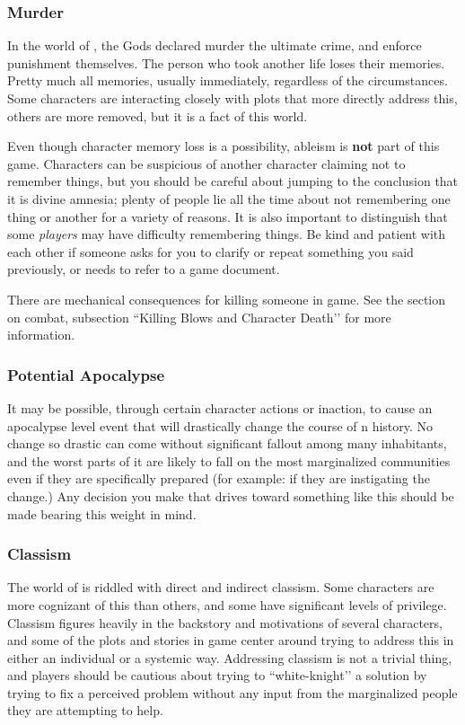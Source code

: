 \documentclass[sheet]{GL2020}
\begin{document}
\subsubsection{Murder}
In the world of \pEarth{}, the Gods declared murder the ultimate crime, and enforce punishment themselves. The person who took another life loses their memories. Pretty much all memories, usually immediately, regardless of the circumstances. Some characters are interacting closely with plots that more directly address this, others are more removed, but it is a fact of this world. 

Even though character memory loss is a possibility, ableism is \textbf{not} part of this game. Characters can be suspicious of another character claiming not to remember things, but you should be careful about jumping to the conclusion that it is divine amnesia; plenty of people lie all the time about not remembering one thing or another for a variety of reasons. It is also important to distinguish that some \emph{players} may have difficulty remembering things. Be kind and patient with each other if someone asks for you to clarify or repeat something you said previously, or needs to refer to a game document.

There are mechanical consequences for killing someone in game. See the section on combat, subsection ``Killing Blows and Character Death’’ for more information.

\subsubsection{Potential Apocalypse}
It may be possible, through certain character actions or inaction, to cause an apocalypse level event that will drastically change the course of \pEarth{}n history. No change so drastic can come without significant fallout among many inhabitants, and the worst parts of it are likely to fall on the most marginalized communities even if they are specifically prepared (for example: if they are instigating the change.) Any decision you make that drives toward something like this should be made bearing this weight in mind.

\subsubsection{Classism}
The world of \pEarth{} is riddled with direct and indirect classism. Some characters are more cognizant of this than others, and some have significant levels of privilege. Classism figures heavily in the backstory and motivations of several characters, and some of the plots and stories in game center around trying to address this in either an individual or a systemic way. Addressing classism is not a trivial thing, and players should be cautious about trying to ``white-knight’’ a solution by trying to fix a perceived problem without any input from the marginalized people they are attempting to help.
\end{document}
